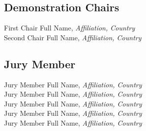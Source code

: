 
\subsection{Demonstration Chairs}
First Chair Full Name, \emph{Affiliation, Country}\\
Second Chair Full Name, \emph{Affiliation, Country}



\subsection{Jury Member}
Jury Member Full Name, \emph{Affiliation, Country}\\
Jury Member Full Name, \emph{Affiliation, Country}\\
Jury Member Full Name, \emph{Affiliation, Country}\\
Jury Member Full Name, \emph{Affiliation, Country}\\
Jury Member Full Name, \emph{Affiliation, Country}\\
